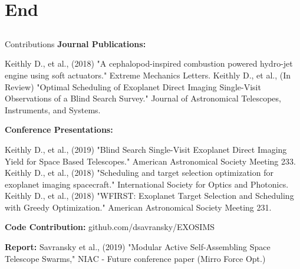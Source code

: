 \documentclass[aspectratio=169]{beamer}
\begin{document}



\section{End}

\subsection{}
\begin{frame}{Contributions}
\textbf{Journal Publications:}
\begin{thebibliography}{9}
Keithly D., et al., (2018) "A cephalopod-inspired combustion powered hydro-jet engine using soft actuators." Extreme Mechanics Letters.
Keithly D., et al., (In Review) "Optimal Scheduling of Exoplanet Direct Imaging Single-Visit Observations of a Blind Search Survey." Journal of Astronomical Telescopes, Instruments, and Systems.
\end{thebibliography}

\textbf{Conference Presentations:}
\begin{thebibliography}{9}
Keithly D., et al., (2019) "Blind Search Single-Visit Exoplanet Direct Imaging Yield for Space Based Telescopes." American Astronomical Society Meeting 233.
Keithly D., et al., (2018) "Scheduling and target selection optimization for exoplanet imaging spacecraft." International Society for Optics and Photonics. 
Keithly D., et al., (2018) "WFIRST: Exoplanet Target Selection and Scheduling with Greedy Optimization." American Astronomical Society Meeting 231.
\end{thebibliography}
\textbf{Code Contribution:} github.com/dsavransky/EXOSIMS

\textbf{Report:} Savransky et al., (2019) "Modular Active Self-Assembling Space Telescope Swarms," NIAC - Future conference paper (Mirro Force Opt.)
\end{frame}
\end{document}
